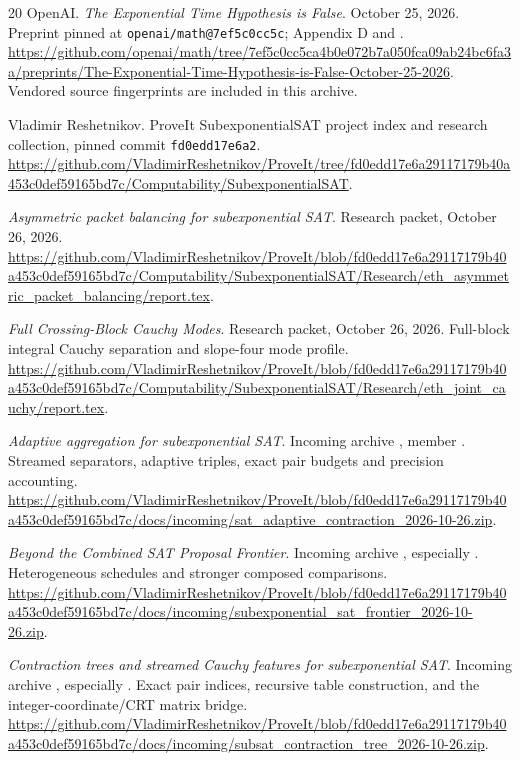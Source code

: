 \begin{thebibliography}{20}
OpenAI. \emph{The Exponential Time Hypothesis is False}. October 25, 2026.
Preprint pinned at \texttt{openai/math@7ef5c0cc5c}; Appendix D and
.
\url{https://github.com/openai/math/tree/7ef5c0cc5ca4b0e072b7a050fca09ab24bc6fa3a/preprints/The-Exponential-Time-Hypothesis-is-False-October-25-2026}.
Vendored source fingerprints are included in this archive.

Vladimir Reshetnikov. ProveIt SubexponentialSAT project index and research
collection, pinned commit \texttt{fd0edd17e6a2}.
\url{https://github.com/VladimirReshetnikov/ProveIt/tree/fd0edd17e6a29117179b40a453c0def59165bd7c/Computability/SubexponentialSAT}.

\emph{Asymmetric packet balancing for subexponential SAT}.
Research packet, October 26, 2026.
\url{https://github.com/VladimirReshetnikov/ProveIt/blob/fd0edd17e6a29117179b40a453c0def59165bd7c/Computability/SubexponentialSAT/Research/eth_asymmetric_packet_balancing/report.tex}.

\emph{Full Crossing-Block Cauchy Modes}. Research packet,
October 26, 2026. Full-block integral Cauchy separation and slope-four
mode profile.
\url{https://github.com/VladimirReshetnikov/ProveIt/blob/fd0edd17e6a29117179b40a453c0def59165bd7c/Computability/SubexponentialSAT/Research/eth_joint_cauchy/report.tex}.

\emph{Adaptive aggregation for subexponential SAT}.
Incoming archive ,
member . Streamed separators, adaptive
triples, exact pair budgets and precision accounting.
\url{https://github.com/VladimirReshetnikov/ProveIt/blob/fd0edd17e6a29117179b40a453c0def59165bd7c/docs/incoming/sat_adaptive_contraction_2026-10-26.zip}.

\emph{Beyond the Combined SAT Proposal Frontier}.
Incoming archive ,
especially . Heterogeneous schedules and stronger
composed comparisons.
\url{https://github.com/VladimirReshetnikov/ProveIt/blob/fd0edd17e6a29117179b40a453c0def59165bd7c/docs/incoming/subexponential_sat_frontier_2026-10-26.zip}.

\newpage
{}
\emph{Contraction trees and streamed Cauchy features for subexponential SAT}.
Incoming archive ,
especially . Exact pair indices, recursive
table construction, and the integer-coordinate/CRT matrix bridge.
\url{https://github.com/VladimirReshetnikov/ProveIt/blob/fd0edd17e6a29117179b40a453c0def59165bd7c/docs/incoming/subsat_contraction_tree_2026-10-26.zip}.


\end{thebibliography}
